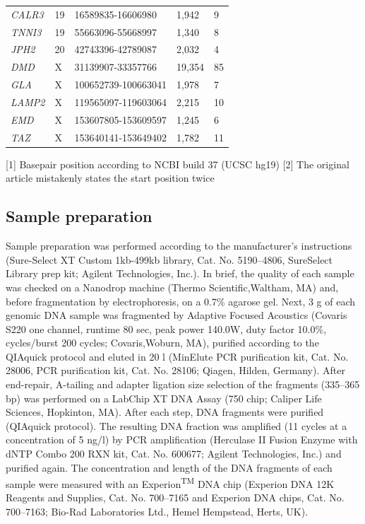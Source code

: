 \begin{table}[H]
\begin{minipage}{\textwidth}
{\begin{tabulary}{\linewidth}{p{1cm}p{1.3cm}p{2.7cm}p{2cm}p{2cm}}
		\rule{0pt}{1ex} \textsl{CALR3} & 19 & 16589835-16606980 & 1,942 & 9 \\
		\rule{0pt}{1ex} \textsl{TNNI3} & 19 & 55663096-55668997 & 1,340 & 8 \\
		\rule{0pt}{1ex} \textsl{JPH2} & 20 & 42743396-42789087 & 2,032 & 4 \\
		\rule{0pt}{1ex} \textsl{DMD} & X & 31139907-33357766 & 19,354 & 85 \\
		\rule{0pt}{1ex} \textsl{GLA} & X & 100652739-100663041 & 1,978 & 7 \\
		\rule{0pt}{1ex} \textsl{LAMP2} & X & 119565097-119603064 & 2,215 & 10 \\
		\rule{0pt}{1ex} \textsl{EMD} & X & 153607805-153609597 & 1,245 & 6 \\
		\rule{0pt}{1ex} \textsl{TAZ} & X & 153640141-153649402 & 1,782 & 11 \\
		\hline
	\end{tabulary}}
\tiny{ [1] Basepair position according to NCBI build 37 (UCSC hg19)}
\tiny{ [2] The original article mistakenly states the start position twice}
\end{minipage}
\end{table}

\subsection{Sample preparation}
Sample preparation was performed according to the manufacturer’s instructions (Sure-Select XT Custom 1kb-499kb library, Cat. No. 5190–4806, SureSelect Library prep kit; Agilent Technologies, Inc.).
In brief, the quality of each sample was checked on a Nanodrop machine (Thermo Scientific,Waltham, MA) and, before fragmentation by electrophoresis, on a 0.7\% agarose gel. 
Next, 3 {\textmu}g of each genomic DNA sample was fragmented by Adaptive Focused Acoustics (Covaris S220 one channel, runtime 80 sec, peak power 140.0W, duty factor 10.0\%, cycles/burst 200 cycles; Covaris,Woburn, MA), purified according to the QIAquick protocol and eluted in 20 {\textmu}l (MinElute PCR purification kit, Cat. No. 28006, PCR purification kit, Cat. No. 28106; Qiagen, Hilden, Germany). 
After end-repair, A-tailing and adapter ligation size selection of the fragments (335–365 bp) was performed on a LabChip XT DNA Assay (750 chip; Caliper Life Sciences, Hopkinton, MA). 
After each step, DNA fragments were purified (QIAquick protocol). 
The resulting DNA fraction was amplified (11 cycles at a concentration of 5 ng/{\textmu}l) by PCR amplification (Herculase II Fusion Enzyme with dNTP Combo 200 RXN kit, Cat. No. 600677; Agilent Technologies, Inc.) and purified again. 
The concentration and length of the DNA fragments of each sample were measured with an Experion\textsuperscript{TM} DNA chip (Experion DNA 12K Reagents and Supplies, Cat. No. 700–7165 and Experion DNA chips, Cat. No. 700–7163; Bio-Rad Laboratories Ltd., Hemel Hempstead, Herts, UK).

